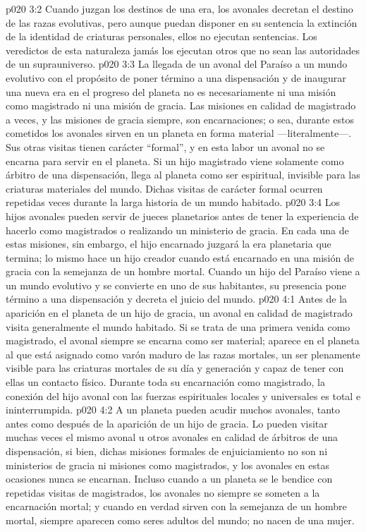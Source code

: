 \vs p020 3:2 Cuando juzgan los destinos de una era, los avonales decretan el destino de las razas evolutivas, pero aunque puedan disponer en su sentencia la extinción de la identidad de criaturas personales, ellos no ejecutan sentencias. Los veredictos de esta naturaleza jamás los ejecutan otros que no sean las autoridades de un suprauniverso.
\vs p020 3:3 La llegada de un avonal del Paraíso a un mundo evolutivo con el propósito de poner término a una dispensación y de inaugurar una nueva era en el progreso del planeta no es necesariamente ni una misión como magistrado ni una misión de gracia. Las misiones en calidad de magistrado a veces, y las misiones de gracia siempre, son encarnaciones; o sea, durante estos cometidos los avonales sirven en un planeta en forma material ---literalmente---. Sus otras visitas tienen carácter “formal”, y en esta labor un avonal no se encarna para servir en el planeta. Si un hijo magistrado viene solamente como árbitro de una dispensación, llega al planeta como ser espiritual, invisible para las criaturas materiales del mundo. Dichas visitas de carácter formal ocurren repetidas veces durante la larga historia de un mundo habitado.
\vs p020 3:4 Los hijos avonales pueden servir de jueces planetarios antes de tener la experiencia de hacerlo como magistrados o realizando un ministerio de gracia. En cada una de estas misiones, sin embargo, el hijo encarnado juzgará la era planetaria que termina; lo mismo hace un hijo creador cuando está encarnado en una misión de gracia con la semejanza de un hombre mortal. Cuando un hijo del Paraíso viene a un mundo evolutivo y se convierte en uno de sus habitantes, su presencia pone término a una dispensación y decreta el juicio del mundo.
\vs p020 4:1 Antes de la aparición en el planeta de un hijo de gracia, un avonal en calidad de magistrado visita generalmente el mundo habitado. Si se trata de una primera venida como magistrado, el avonal siempre se encarna como ser material; aparece en el planeta al que está asignado como varón maduro de las razas mortales, un ser plenamente visible para las criaturas mortales de su día y generación y capaz de tener con ellas un contacto físico. Durante toda su encarnación como magistrado, la conexión del hijo avonal con las fuerzas espirituales locales y universales es total e ininterrumpida.
\vs p020 4:2 A un planeta pueden acudir muchos avonales, tanto antes como después de la aparición de un hijo de gracia. Lo pueden visitar muchas veces el mismo avonal u otros avonales en calidad de árbitros de una dispensación, si bien, dichas misiones formales de enjuiciamiento no son ni ministerios de gracia ni misiones como magistrados, y los avonales en estas ocasiones nunca se encarnan. Incluso cuando a un planeta se le bendice con repetidas visitas de magistrados, los avonales no siempre se someten a la encarnación mortal; y cuando en verdad sirven con la semejanza de un hombre mortal, siempre aparecen como seres adultos del mundo; no nacen de una mujer.
